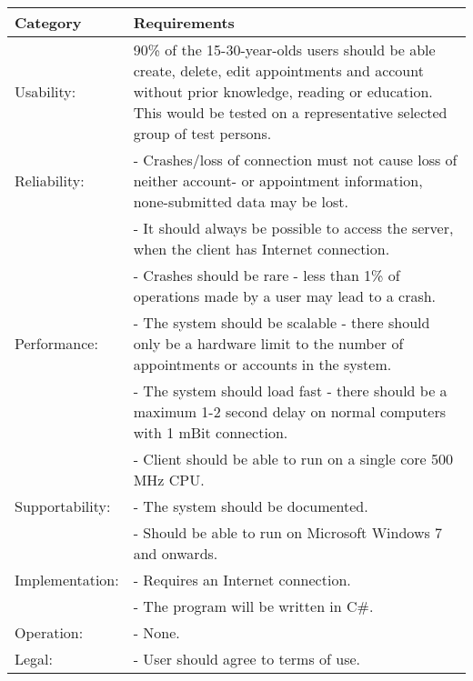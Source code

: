 {\tabulinesep=1.2mm
\begin{tabu}{ | p{3cm} | p{13cm} |}
    \hline
    Category	 			& 		Requirements \\\hline
    Usability:	  			& 		90\% of the 15-30-year-olds users should be able create, delete, edit appointments and account without prior knowledge, reading or education. This would be tested on a representative selected group of test persons.\\\hline
    Reliability: 			& 		- Crashes/loss of connection must not cause loss of neither account- or appointment information, none-submitted data may be lost. \\
							&		- It should always be possible to access the server, when the client has Internet connection.\\
							&		- Crashes should be rare - less than 1\% of operations made by a user may lead to a crash. \\ \hline
	Performance:			&		- The system should be scalable - there should only be a hardware limit to the number of appointments or accounts in the system.\\
							&		- The system should load fast - there should be a maximum 1-2 second delay on normal computers with 1 mBit connection.\\
							&		- Client should be able to run on a single core 500 MHz CPU.\\ \hline
    Supportability: 		& 		- The system should be documented.  \\
    						&		- Should be able to run on Microsoft Windows 7 and onwards. \\ \hline
	Implementation: 		&		- Requires an Internet connection.\\
							&		- The program will be written in C\#.\\\hline
	Operation:				&	 	- None. \\\hline
	Legal:					&		- User should agree to terms of use.\\\hline
\end{tabu}
}

